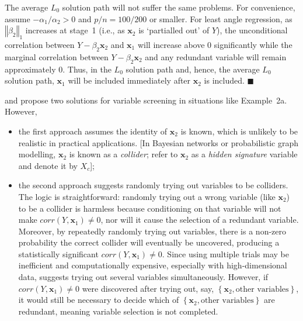 \documentclass[11pt,review,authoryear]{elsarticle}
\begin{document}
The average $L_0$ solution path will not suffer the same problems. For convenience, assume $-\alpha_1 / \alpha_2 > 0$ and $p/n = 100/200$ or smaller. For least angle regression, as $\left\Vert \beta_2 \right\Vert_1$ increases at stage~1 (i.e., as $\mathbf{x}_2$ is `partialled out' of $Y$), the unconditional correlation between $Y - \beta_2 \mathbf{x}_2$ and $\mathbf{x}_1$ will increase above $0$ significantly while the marginal correlation between $Y - \beta_2 \mathbf{x}_2$ and any redundant variable will remain approximately $0$. Thus, in the $L_0$ solution path and, hence, the average $L_0$ solution path, $\mathbf{x}_1$ will be included immediately after $\mathbf{x}_2$ is included. $\blacksquare$

\bigskip
\citet{fan2008sure} and \citet{barut2016conditional} propose two solutions for variable screening in situations like Example~2a. However,

\begin{itemize}
  \item the first approach \citep[Section~2.2 and~3]{barut2016conditional} assumes the identity of $\mathbf{x}_2$ is known, which is unlikely to be realistic in practical applications. [In Bayesian networks or probabilistic graph modelling, $\mathbf{x}_2$ is known as a \emph{collider}; \citet{barut2016conditional} refer to $\mathbf{x}_2$ as a \emph{hidden signature} variable and denote it by $X_c$];
  \item the second approach \citep[Section~1 and~2.2]{barut2016conditional} suggests randomly trying out variables to be colliders. The logic is straightforward: randomly trying out a wrong variable (like $\mathbf{x}_2$) to be a collider is harmless because conditioning on that variable will not make $corr(Y,\mathbf{x}_1) \neq 0$, nor will it cause the selection of a redundant variable. Moreover, by repeatedly randomly trying out variables, there is a non-zero probability the correct collider will eventually be uncovered, producing a statistically significant $corr(Y,\mathbf{x}_1) \neq 0$. Since using multiple trials may be inefficient and computationally expensive, especially with high-dimensional data, \citet{barut2016conditional} suggests trying out several variables simultaneously. However, if $corr(Y, \mathbf{x}_1) \neq 0$ were discovered after trying out, say, $\left\{\mathbf{x}_2,\mbox{other variables}\right\}$, it would still be necessary to decide which of $\left\{\mathbf{x}_2,\mbox{other variables}\right\}$ are redundant, meaning variable selection is not completed.
\end{itemize}
\end{document}
